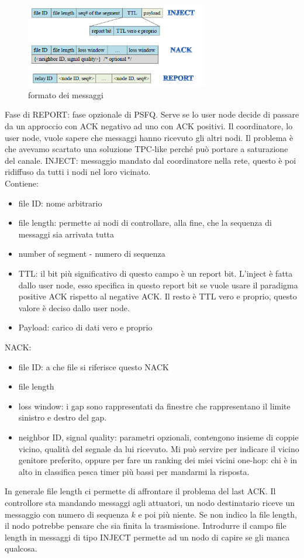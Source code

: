\documentclass[12pt,italian]{report}
\begin{document}
\begin{figure}[h]
\centering
\includegraphics[width=80mm]{img/formato.PNG}
\caption{formato dei messaggi}
\label{fig:form}
\end{figure}
\noindent Fase di REPORT: fase opzionale di PSFQ. Serve se lo user node decide di passare da un approccio con ACK negativo ad uno con ACK positivi. Il coordinatore, lo user node, vuole sapere che messaggi hanno ricevuto gli altri nodi. Il problema è che avevamo scartato una soluzione TPC-like perché può portare a saturazione del canale.
\newpage
\noindent INJECT: messaggio mandato dal coordinatore nella rete, questo è poi ridiffuso da tutti i nodi nel loro vicinato. \\ Contiene:
\begin{itemize}
    \item file ID: nome arbitrario 
    \item file length: permette ai nodi di controllare, alla fine, che la sequenza di messaggi sia arrivata tutta
    \item number of segment - numero di sequenza
    \item TTL: il bit più significativo di questo campo è un report bit. L'inject è fatta dallo user node, esso specifica in questo report bit se vuole usare il paradigma positive ACK rispetto al negative ACK. Il resto è TTL vero e proprio, questo valore è deciso dallo user node. 
    \item Payload: carico di dati vero e proprio
\end{itemize}
\noindent NACK:
\begin{itemize}
    \item file ID: a che file si riferisce questo NACK
    \item file length
    \item loss window: i gap sono rappresentati da finestre che rappresentano il limite sinistro e destro del gap. 
    \item {neighbor ID, signal quality}: parametri opzionali, contengono insieme di coppie {vicino, qualità del segnale da lui ricevuto}. Mi può servire per indicare il vicino genitore preferito, oppure per fare un ranking dei miei vicini one-hop: chi è in alto in classifica pesca timer più bassi per mandarmi la risposta. 
\end{itemize}
In generale file length ci permette di affrontare il problema del last ACK. Il controllore sta mandando messaggi agli attuatori, un nodo destinatario riceve un messaggio con numero di sequenza $k$ e poi più niente. Se non indico la file length, il nodo potrebbe pensare che sia finita la trasmissione. Introdurre il campo file length in messaggi di tipo INJECT permette ad un nodo di capire se gli manca qualcosa.
\end{document}
